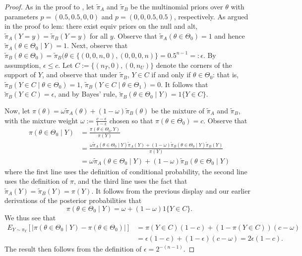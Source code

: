 \documentclass[12pt,reqno]{amsart}
\theoremstyle{theorem}
\theoremstyle{definition}
\newcommand{\0}{\mathbf{0}}
\newcommand{\1}{\mathbf{1}}
\begin{document}
\begin{proof}
As in the proof to , let
$\tilde\pi_A$ and $\tilde\pi_B$ be the multinomial priors over $\theta$ with parameters
$p=(0.5,0.5,0,0)$ and $p=(0,0,0.5,0.5)$, respectively. As argued in the proof to \Cref
{lem: there exist equiv priors on the null and alt}, $\tilde{\pi}_A(Y{=}y) = \tilde{\pi}_B
(Y{=}y)$ for all $y$. Observe that $\tilde{\pi}_A(\theta \in \Theta_0) = 1$ and hence
$\tilde\pi_A( \theta \in \Theta_0 \mid Y) = 1$. Next, observe that $\tilde\pi_B(\theta \in
\Theta_0) = \tilde\pi_B( \theta \in \{(0,0,n,0),(0,0,0,n)\} = 0.5^{n-1} =: \epsilon$. By assumption, $\epsilon \leq c$. Let $C := \{(n_T,0), (0,n_U)\}$
denote the corners of the support of $Y$, and observe that under $\tilde{\pi}_B$, $Y \in
C$ if and only if $\theta \in \Theta_0$: that is, $\tilde\pi_B( Y \in C \mid \theta \in
\Theta_0) = 1$, $\tilde\pi_B(Y \in C \mid \theta \in \Theta_1) = 0$.  It follows that
$\tilde\pi_B(Y \in C) = \epsilon$, and by Bayes' rule, $\tilde\pi_B(\theta \in \Theta_0
\mid Y) = 1\{ Y \in C \}$.

Now, let $\pi(\theta) = \omega \tilde\pi_A(\theta) + (1-\omega) \tilde\pi_B(\theta)$ be the mixture of $\tilde\pi_A$ and $\tilde\pi_B$, with the mixture weight $\omega := \tfrac{c-\epsilon}{1-\epsilon}$ chosen so that $\pi(\theta \in \Theta_0) = c$. Observe that
\begin{align*}
   \pi(\theta \in \Theta_0 \mid Y) &= \frac{ \pi(\theta \in \Theta_0, Y) }{ \pi(Y) } \\ 
   &= \frac{ \omega \tilde\pi_A(\theta \in \Theta_0 \mid Y) \tilde\pi_A(Y) + (1-\omega) \tilde\pi_B(\theta \in \Theta_0 \mid Y) \tilde\pi_B(Y)  }{ \pi(Y) }  \\
   &= \omega \tilde \pi_A(\theta \in \Theta_0 \mid Y) + (1-\omega) \tilde\pi_B(\theta \in \Theta_0 \mid Y) 
\end{align*}
where the first line uses the definition of conditional probability, the second line uses the definition of $\pi$, and the third line uses the fact that $\tilde\pi_A(Y) = \tilde\pi_B(Y) = \pi(Y)$. It follows from the previous display and our earlier derivations of the posterior probabilities that 
\[ \pi(\theta \in \Theta_0 \mid Y) = \omega + (1-\omega) 1\{Y \in C\}. \]
We thus see that
\begin{align*}
 E_{Y \sim \pi_Y}\left[ \left|  \pi(\theta \in \Theta_0 \mid Y) - \pi(\theta \in \Theta_0)   \right| \right] &= \pi(Y \in C) (1-c) + (1- \pi(Y\in C)) (c- \omega ) \\
 &= \epsilon \left(1 - c\right) + (1- \epsilon) (c - \omega) = 2 \epsilon (1-c).
\end{align*}
\noindent The result then follows from the definition of $\epsilon = 2^{-(n-1)}$.
\end{proof}
\end{document}
